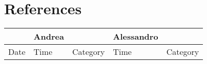 \chapter{References}
\begin{center}
	\begin{tabular}{ | m{2cm} | m{1cm}| m{2cm} | m{1cm}| m{2cm} | } 
		\hline
			     & Andrea &          & Alessandro &          \\
		\hline
			Date & Time   & Category & Time       & Category \\
	\end{tabular}
\end{center}
